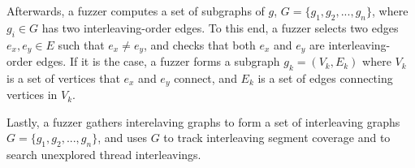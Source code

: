 





Afterwards, a fuzzer computes a set of subgraphs of $g$,
$G = \{g_1, g_2, ..., g_n\}$, where $g_i \in G$ has two
interleaving-order edges.
%
%
To this end, a fuzzer selects two edges $e_x, e_y \in E$ such that
$e_x \neq e_y$, and checks that both $e_x$ and $e_y$ are
interleaving-order edges.
%
If it is the case, a fuzzer forms a subgraph $g_k = (V_k, E_k)$ where
$V_k$ is a set of vertices that $e_x$ and $e_y$ connect, and $E_k$ is
a set of edges connecting vertices in $V_k$.
%


Lastly, a fuzzer gathers interelaving graphs to form a set of
interleaving graphs $G = \{g_1, g_2, ..., g_n\}$, and uses $G$ to
track interleaving segment coverage and to search unexplored thread
interleavings.






